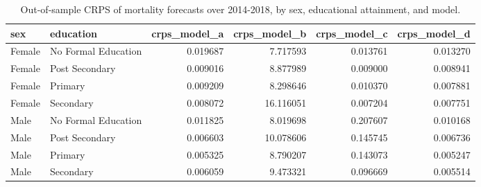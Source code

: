 \begin{table}[ht]
\centering
\begin{tabular}{llrrrr}
\hline
sex & education & crps_model_a & crps_model_b & crps_model_c & crps_model_d \\
\hline
Female & No Formal Education & 0.019687 & 7.717593 & 0.013761 & 0.013270 \\
Female & Post Secondary & 0.009016 & 8.877989 & 0.009000 & 0.008941 \\
Female & Primary & 0.009209 & 8.298646 & 0.010370 & 0.007881 \\
Female & Secondary & 0.008072 & 16.116051 & 0.007204 & 0.007751 \\
Male & No Formal Education & 0.011825 & 8.019698 & 0.207607 & 0.010168 \\
Male & Post Secondary & 0.006603 & 10.078606 & 0.145745 & 0.006736 \\
Male & Primary & 0.005325 & 8.790207 & 0.143073 & 0.005247 \\
Male & Secondary & 0.006059 & 9.473321 & 0.096669 & 0.005514 \\
\hline
\end{tabular}
\caption{Out-of-sample CRPS of mortality forecasts over 2014-2018, by sex, educational attainment, and model.}
\label{tab:new_table_e4}
\end{table}
